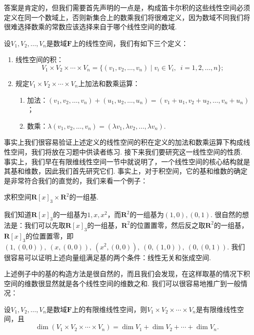 答案是肯定的，但我们需要首先声明的一点是，构成笛卡尔积的这些线性空间必须定义在同一个数域上，否则新集合上的数乘我们将很难定义，因为数域不同我们将很难选择数乘的常数应该选择来自于哪个线性空间的数域.
\begin{definition}\label{def:8:积空间}
    设$V_1,V_2,\ldots,V_n$是数域$\mathbf{F}$上的线性空间，我们有如下三个定义：
    \begin{enumerate}
        \item 线性空间的积：
              \[V_1 \times V_2 \times \cdots \times V_n=\{(v_1,v_2,\ldots,v_n)\mid v_i \in V_i,\enspace i=1,2,\ldots,n\};\]

        \item 规定$V_1 \times V_2 \times \cdots \times V_n$上加法和数乘运算：
              \begin{enumerate}
                  \item 加法：$(v_1,v_2,\ldots,v_n)+(u_1,u_2,\ldots,u_n)=(v_1+u_1,v_2+u_2,\ldots,v_n+u_n)$；

                  \item 数乘：$\lambda(v_1,v_2,\ldots,v_n)=(\lambda v_1,\lambda v_2,\ldots,\lambda v_n)$.
              \end{enumerate}
    \end{enumerate}
\end{definition}

事实上我们很容易验证上述定义的线性空间的积在定义的加法和数乘运算下构成线性空间，我们将放在习题中供读者练习. 接下来我们要研究这一线性空间的性质. 事实上，我们早在有限维线性空间一节中就说明了，一个线性空间的核心结构就是其基和维数，因此我们首先研究它们. 事实上，对于积空间，它的基和维数的确定是非常符合我们的直觉的，我们来看一个例子：
\begin{example}
    求积空间$\mathbf{R}[x]_3\times\mathbf{R}^2$的一组基.
\end{example}

\begin{solution}
    我们知道$\mathbf{R}[x]_3$的一组基为$1,x,x^2$，而$\mathbf{R}^2$的一组基为$(1,0),(0,1)$. 很自然的想法是：我们可以先取$\mathbf{R}[x]_3$的一组基，$\mathbf{R}^2$的位置置零，然后反之取$\mathbf{R}^2$的一组基，$\mathbf{R}[x]_3$的位置置零，即$(1,(0,0)),\ (x,(0,0)),\ (x^2,(0,0)),\ (0,(1,0)),\ (0,(0,1))$. 我们很容易可以证明上述向量组满足基的两个条件：线性无关和张成空间.
\end{solution}

上述例子中的基的构造方法是很自然的，而且我们会发现，在这样取基的情况下积空间的维数很显然就是各个线性空间的维数之和. 我们可以很容易地推广到一般情况：
\begin{theorem}\label{thm:8:积空间维数}
    设$V_1,V_2,\ldots,V_n$是数域$\mathbf{F}$上的有限维线性空间，则$V_1 \times V_2 \times \cdots \times V_n$是有限维线性空间，且
    \[\dim(V_1 \times V_2 \times \cdots \times V_n)=\dim V_1+\dim V_2+\cdots+\dim V_n.\]
\end{theorem}

